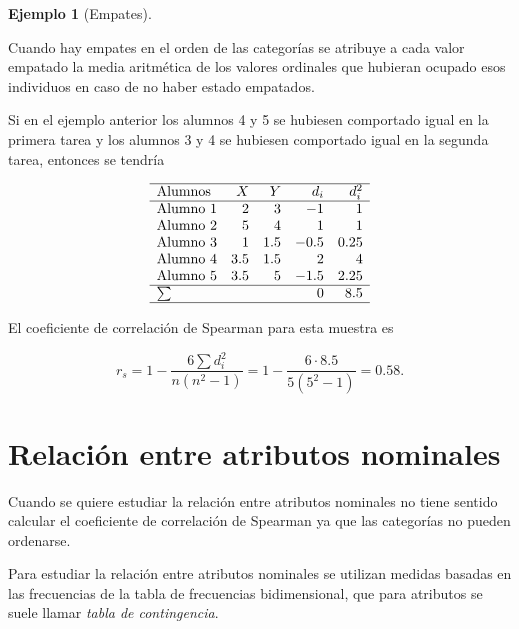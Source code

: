 \documentclass[
  spanish,
  a4paper,
]{scrreport}
\theoremstyle{plain}
\theoremstyle{definition}
\newtheorem{example}{Ejemplo}[chapter]
\theoremstyle{definition}
\theoremstyle{remark}
\begin{document}
\begin{example}[Empates]\protect\hypertarget{exm-coeficiente-correlacion-sperman-empates}{}\label{exm-coeficiente-correlacion-sperman-empates}

Cuando hay empates en el orden de las categorías se atribuye a cada
valor empatado la media aritmética de los valores ordinales que hubieran
ocupado esos individuos en caso de no haber estado empatados.

Si en el ejemplo anterior los alumnos 4 y 5 se hubiesen comportado igual
en la primera tarea y los alumnos 3 y 4 se hubiesen comportado igual en
la segunda tarea, entonces se tendría

\[
\begin{array}{lrrrr}
\hline
\mbox{Alumnos} & X & Y & d_i & d_i^2\\
\hline
\mbox{Alumno 1} & 2 & 3 & -1 & 1\\
\mbox{Alumno 2} & 5 & 4 & 1 & 1 \\
\mbox{Alumno 3} & 1 & 1.5 & -0.5 & 0.25\\
\mbox{Alumno 4} & 3.5 & 1.5 & 2 & 4\\
\mbox{Alumno 5} & 3.5 & 5 & -1.5 & 2.25\\
\hline
\sum &  &  & 0 & 8.5 \\
\hline
\end{array}
\]

El coeficiente de correlación de Spearman para esta muestra es

\[
r_s = 1-\frac{6\sum d_i^2}{n(n^2-1)} = 1- \frac{6\cdot 8.5}{5(5^2-1)} = 0.58.
\]

\end{example}

\section{Relación entre atributos
nominales}\label{relaciuxf3n-entre-atributos-nominales}

Cuando se quiere estudiar la relación entre atributos nominales no tiene
sentido calcular el coeficiente de correlación de Spearman ya que las
categorías no pueden ordenarse.

Para estudiar la relación entre atributos nominales se utilizan medidas
basadas en las frecuencias de la tabla de frecuencias bidimensional, que
para atributos se suele llamar \emph{tabla de contingencia}.
\end{document}
